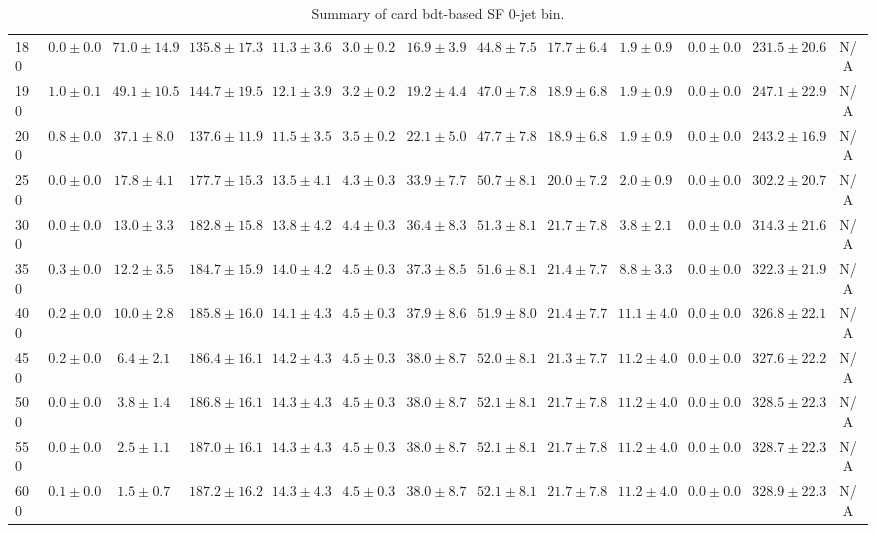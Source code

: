 \begin{table}
{\begin{center}
\begin{tabular}{l | c c | c c c c c c c c  | c c}
180 & $0.0\pm0.0$ & $71.0\pm14.9$ & $135.8\pm17.3$ & $11.3\pm3.6$ & $3.0\pm0.2$ & $16.9\pm3.9$ & $44.8\pm7.5$ & $17.7\pm6.4$ & $1.9\pm0.9$ & $0.0\pm0.0$ & $231.5\pm20.6$ & N/A \\
190 & $1.0\pm0.1$ & $49.1\pm10.5$ & $144.7\pm19.5$ & $12.1\pm3.9$ & $3.2\pm0.2$ & $19.2\pm4.4$ & $47.0\pm7.8$ & $18.9\pm6.8$ & $1.9\pm0.9$ & $0.0\pm0.0$ & $247.1\pm22.9$ & N/A \\
200 & $0.8\pm0.0$ & $37.1\pm8.0$ & $137.6\pm11.9$ & $11.5\pm3.5$ & $3.5\pm0.2$ & $22.1\pm5.0$ & $47.7\pm7.8$ & $18.9\pm6.8$ & $1.9\pm0.9$ & $0.0\pm0.0$ & $243.2\pm16.9$ & N/A \\
250 & $0.0\pm0.0$ & $17.8\pm4.1$ & $177.7\pm15.3$ & $13.5\pm4.1$ & $4.3\pm0.3$ & $33.9\pm7.7$ & $50.7\pm8.1$ & $20.0\pm7.2$ & $2.0\pm0.9$ & $0.0\pm0.0$ & $302.2\pm20.7$ & N/A \\
300 & $0.0\pm0.0$ & $13.0\pm3.3$ & $182.8\pm15.8$ & $13.8\pm4.2$ & $4.4\pm0.3$ & $36.4\pm8.3$ & $51.3\pm8.1$ & $21.7\pm7.8$ & $3.8\pm2.1$ & $0.0\pm0.0$ & $314.3\pm21.6$ & N/A \\
350 & $0.3\pm0.0$ & $12.2\pm3.5$ & $184.7\pm15.9$ & $14.0\pm4.2$ & $4.5\pm0.3$ & $37.3\pm8.5$ & $51.6\pm8.1$ & $21.4\pm7.7$ & $8.8\pm3.3$ & $0.0\pm0.0$ & $322.3\pm21.9$ & N/A \\
400 & $0.2\pm0.0$ & $10.0\pm2.8$ & $185.8\pm16.0$ & $14.1\pm4.3$ & $4.5\pm0.3$ & $37.9\pm8.6$ & $51.9\pm8.0$ & $21.4\pm7.7$ & $11.1\pm4.0$ & $0.0\pm0.0$ & $326.8\pm22.1$ & N/A \\
450 & $0.2\pm0.0$ & $6.4\pm2.1$ & $186.4\pm16.1$ & $14.2\pm4.3$ & $4.5\pm0.3$ & $38.0\pm8.7$ & $52.0\pm8.1$ & $21.3\pm7.7$ & $11.2\pm4.0$ & $0.0\pm0.0$ & $327.6\pm22.2$ & N/A \\
500 & $0.0\pm0.0$ & $3.8\pm1.4$ & $186.8\pm16.1$ & $14.3\pm4.3$ & $4.5\pm0.3$ & $38.0\pm8.7$ & $52.1\pm8.1$ & $21.7\pm7.8$ & $11.2\pm4.0$ & $0.0\pm0.0$ & $328.5\pm22.3$ & N/A \\
550 & $0.0\pm0.0$ & $2.5\pm1.1$ & $187.0\pm16.1$ & $14.3\pm4.3$ & $4.5\pm0.3$ & $38.0\pm8.7$ & $52.1\pm8.1$ & $21.7\pm7.8$ & $11.2\pm4.0$ & $0.0\pm0.0$ & $328.7\pm22.3$ & N/A \\
600 & $0.1\pm0.0$ & $1.5\pm0.7$ & $187.2\pm16.2$ & $14.3\pm4.3$ & $4.5\pm0.3$ & $38.0\pm8.7$ & $52.1\pm8.1$ & $21.7\pm7.8$ & $11.2\pm4.0$ & $0.0\pm0.0$ & $328.9\pm22.3$ & N/A \\
\hline
\end{tabular}
\end{center}
}
\caption{Summary of card bdt-based SF 0-jet bin.}
\end{table}
